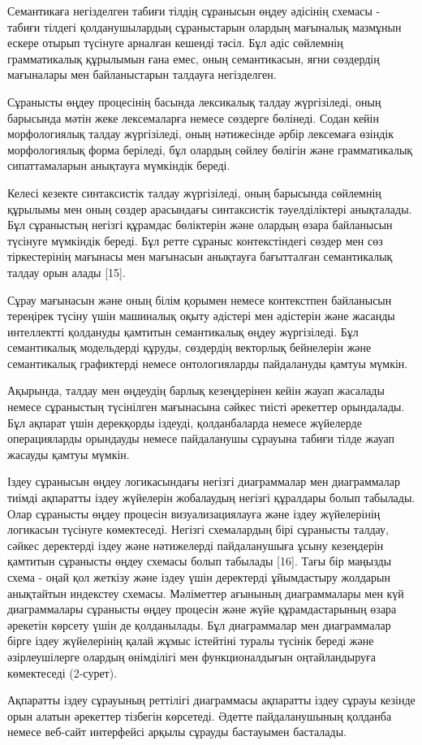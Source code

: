 \begin{multicols}{2}

Семантикаға негізделген табиғи тілдің сұранысын өңдеу әдісінің схемасы -
табиғи тілдегі қолданушылардың сұраныстарын олардың мағыналық мазмұнын
ескере отырып түсінуге арналған кешенді тәсіл. Бұл әдіс сөйлемнің
грамматикалық құрылымын ғана емес, оның семантикасын, яғни сөздердің
мағыналары мен байланыстарын талдауға негізделген.

Сұранысты өңдеу процесінің басында лексикалық талдау жүргізіледі, оның
барысында мәтін жеке лексемаларға немесе сөздерге бөлінеді. Содан кейін
морфологиялық талдау жүргізіледі, оның нәтижесінде әрбір лексемаға
өзіндік морфологиялық форма беріледі, бұл олардың сөйлеу бөлігін және
грамматикалық сипаттамаларын анықтауға мүмкіндік береді.

Келесі кезекте синтаксистік талдау жүргізіледі, оның барысында сөйлемнің
құрылымы мен оның сөздер арасындағы синтаксистік тәуелділіктері
анықталады. Бұл сұраныстың негізгі құрамдас бөліктерін және олардың
өзара байланысын түсінуге мүмкіндік береді. Бұл ретте сұраныс
контекстіндегі сөздер мен сөз тіркестерінің мағынасы мен мағынасын
анықтауға бағытталған семантикалық талдау орын алады {[}15{]}.

Сұрау мағынасын және оның білім қорымен немесе контекстпен байланысын
тереңірек түсіну үшін машиналық оқыту әдістері мен әдістерін және
жасанды интеллектті қолдануды қамтитын семантикалық өңдеу жүргізіледі.
Бұл семантикалық модельдерді құруды, сөздердің векторлық бейнелерін және
семантикалық графиктерді немесе онтологияларды пайдалануды қамтуы
мүмкін.

Ақырында, талдау мен өңдеудің барлық кезеңдерінен кейін жауап жасалады
немесе сұраныстың түсінілген мағынасына сәйкес тиісті әрекеттер
орындалады. Бұл ақпарат үшін дерекқорды іздеуді, қолданбаларда немесе
жүйелерде операцияларды орындауды немесе пайдаланушы сұрауына табиғи
тілде жауап жасауды қамтуы мүмкін.

Іздеу сұранысын өңдеу логикасындағы негізгі диаграммалар мен
диаграммалар тиімді ақпаратты іздеу жүйелерін жобалаудың негізгі
құралдары болып табылады. Олар сұранысты өңдеу процесін
визуализациялауға және іздеу жүйелерінің логикасын түсінуге көмектеседі.
Негізгі схемалардың бірі сұранысты талдау, сәйкес деректерді іздеу және
нәтижелерді пайдаланушыға ұсыну кезеңдерін қамтитын сұранысты өңдеу
схемасы болып табылады {[}16{]}. Тағы бір маңызды схема - оңай қол
жеткізу және іздеу үшін деректерді ұйымдастыру жолдарын анықтайтын
индекстеу схемасы. Мәліметтер ағынының диаграммалары мен күй
диаграммалары сұранысты өңдеу процесін және жүйе құрамдастарының өзара
әрекетін көрсету үшін де қолданылады. Бұл диаграммалар мен диаграммалар
бірге іздеу жүйелерінің қалай жұмыс істейтіні туралы түсінік береді және
әзірлеушілерге олардың өнімділігі мен функционалдығын оңтайландыруға
көмектеседі (2-сурет).

Ақпаратты іздеу сұрауының реттілігі диаграммасы ақпаратты іздеу сұрауы
кезінде орын алатын әрекеттер тізбегін көрсетеді. Әдетте пайдаланушының
қолданба немесе веб-сайт интерфейсі арқылы сұрауды бастауымен басталады.
\end{multicols}


